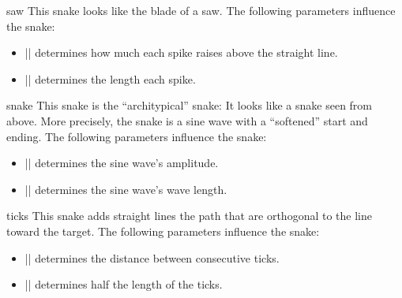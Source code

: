 \begin{snake}{saw}
  This snake looks like the blade of a saw. The following parameters
  influence the snake:
  \begin{itemize}
  \item |\pgfsnakesegmentamplitude|
    determines how much each spike raises above the straight line.
  \item |\pgfsnakesegmentlength|
    determines the length each spike.
  \end{itemize}
\begin{codeexample}[]
\end{codeexample}
\end{snake}


\begin{snake}{snake}
  This snake is the ``architypical'' snake: It looks like a snake seen
  from above. More precisely, the snake is a sine wave with a
  ``softened'' start and ending. The following parameters influence
  the snake: 
  \begin{itemize}
  \item |\pgfsnakesegmentamplitude|
    determines the sine wave's amplitude.
  \item |\pgfsnakesegmentlength|
    determines the sine wave's wave length.
  \end{itemize}
\begin{codeexample}[]
\end{codeexample}
\end{snake}


\begin{snake}{ticks}
  This snake adds straight lines  the path that are orthogonal to the
  line toward the target. The following parameters influence the snake: 
  \begin{itemize}
  \item |\pgfsnakesegmentlength|
    determines the distance between consecutive ticks.
  \item |\pgfsnakesegmentamplitude|
    determines half the length of the ticks.
  \end{itemize}
\begin{codeexample}[]
\end{codeexample}
\end{snake}

